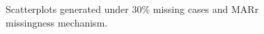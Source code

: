 \documentclass[12pt, fullpage, a4paper]{article}
\begin{document}
\begin{figure}
\begin{center}
{{			}
		}
	\end{center}
	\caption{Scatterplots generated under 30\% missing cases and MARr missingness mechanism.}
	\label{fig5}
\end{figure}
\end{document}
